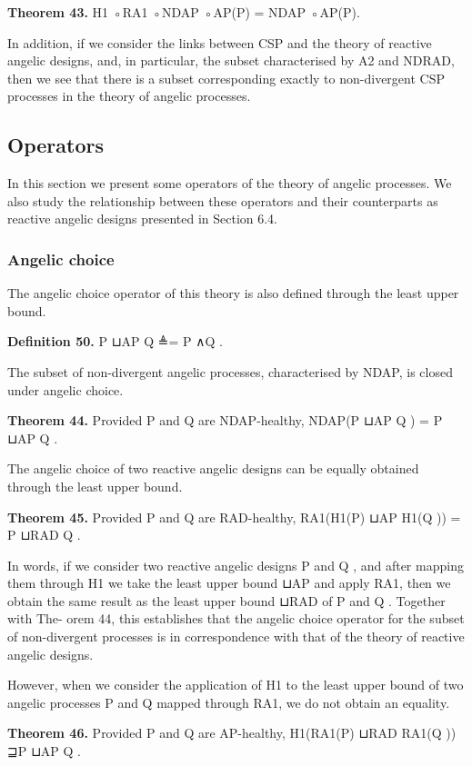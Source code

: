 \documentclass[11pt]{article}
\begin{document}
\noindent\textbf{Theorem 43.} H1 ◦RA1 ◦NDAP ◦AP(P) = NDAP ◦AP(P).


In addition, if we consider the links between CSP and the theory of reactive angelic designs, and, in particular, the subset characterised by A2 and NDRAD, then we see that there is a subset corresponding exactly to non-divergent CSP processes in the theory of angelic processes.

\subsection{Operators}
In this section we present some operators of the theory of angelic processes. We also study the relationship between these operators and their counterparts as reactive angelic designs presented in Section 6.4.

\subsubsection{Angelic choice}
The angelic choice operator of this theory is also defined through the least upper bound.

\noindent\textbf{Definition 50.} P ⊔AP Q ≜= P ∧Q .


The subset of non-divergent angelic processes, characterised by NDAP, is closed under angelic choice.

\noindent\textbf{Theorem 44.} Provided P and Q are NDAP-healthy, NDAP(P ⊔AP Q ) = P ⊔AP Q .


The angelic choice of two reactive angelic designs can be equally obtained through the least upper bound.

\noindent\textbf{Theorem 45.} Provided P and Q are RAD-healthy, RA1(H1(P) ⊔AP H1(Q )) = P ⊔RAD Q .


In words, if we consider two reactive angelic designs P and Q , and after mapping them through H1 we take the least upper bound ⊔AP and apply RA1, then we obtain the same result as the least upper bound ⊔RAD of P and Q . Together with The- orem 44, this establishes that the angelic choice operator for the subset of non-divergent processes is in correspondence with that of the theory of reactive angelic designs.

However, when we consider the application of H1 to the least upper bound of two angelic processes P and Q mapped through RA1, we do not obtain an equality.

\noindent\textbf{Theorem 46.} Provided P and Q are AP-healthy, H1(RA1(P) ⊔RAD RA1(Q )) ⊒P ⊔AP Q .
\end{document}
